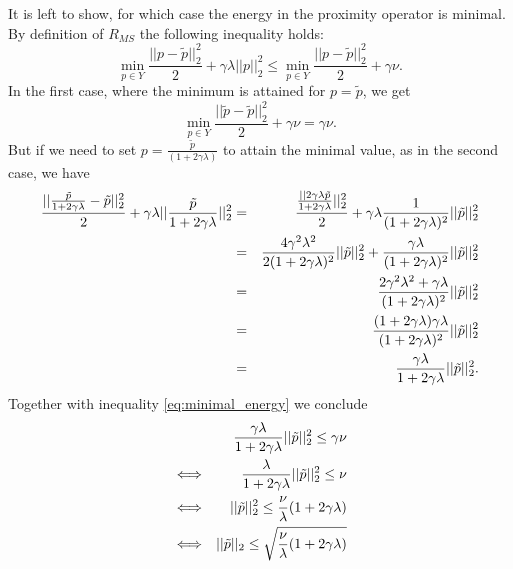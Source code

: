        It is left to show, for which case the energy in the proximity operator is minimal. By definition of  $R_{MS}$ the following inequality holds:
            \begin{equation}
                \min_{p \in Y} \frac{||p - \tilde{p}||_{2}^{2}}{2} + \gamma \lambda ||p||_{2}^{2} \le \min_{p \in Y} \frac{||p - \tilde{p}||_{2}^{2}}{2} + \gamma\nu.
                \label{eq:minimal_energy}
            \end{equation}
        In the first case, where the minimum is attained for $p = \tilde{p}$, we get
            $$
                \min_{p \in Y} \frac{||\tilde{p} - \tilde{p}||_{2}^{2}}{2} + \gamma\nu = \gamma \nu.
            $$
        But if we need to set $p = \frac{\tilde{p}}{(1 + 2\gamma \lambda)}$ to attain the minimal value, as in the second case, we have
            \begin{eqnarray}
                \frac{||\frac{\tilde{p}}{1 + 2\gamma\lambda} - \tilde{p}||_{2}^{2}}{2} + \gamma \lambda ||\frac{\tilde{p}}{1 + 2\gamma\lambda}||_{2}^{2} &=& \frac{\frac{||2\gamma\lambda \tilde{p}}{1 + 2\gamma\lambda}||_{2}^{2}}{2} + \gamma\lambda \frac{1}{(1 + 2\gamma\lambda)^{2}}||\tilde{p}||_{2}^{2} \notag \\
                &=& \frac{4\gamma^{2}\lambda^{2}}{2(1 + 2\gamma\lambda)^{2}} ||\tilde{p}||_{2}^{2} + \frac{\gamma\lambda}{(1 + 2\gamma\lambda)^{2}} ||\tilde{p}||_{2}^{2} \notag \\
                &=& \frac{2\gamma^{2}\lambda^{2} + \gamma\lambda}{(1 + 2\gamma\lambda)^{2}} ||\tilde{p}||_{2}^{2} \notag \\
                &=& \frac{(1 + 2\gamma\lambda)\gamma\lambda}{(1 + 2\gamma\lambda)^{2}} ||\tilde{p}||_{2}^{2} \notag \\
                &=& \frac{\gamma\lambda}{1 + 2\gamma\lambda} ||\tilde{p}||_{2}^{2}. \label{eq:bound_on_p}
            \end{eqnarray}
        Together with inequality \ref{eq:minimal_energy} we conclude
            \begin{eqnarray}
                && \frac{\gamma\lambda}{1 + 2\gamma\lambda} ||\tilde{p}||_{2}^{2} \le \gamma\nu \notag \\
                &\Longleftrightarrow& \frac{\lambda}{1 + 2\gamma\lambda} ||\tilde{p}||_{2}^{2} \le \nu \notag \\
                &\Longleftrightarrow& ||\tilde{p}||_{2}^{2} \le \frac{\nu}{\lambda}(1 + 2\gamma\lambda) \notag \\
                &\Longleftrightarrow& ||\tilde{p}||_{2} \le \sqrt{\frac{\nu}{\lambda}(1 + 2\gamma\lambda)} \label{eq:constraint_R}
            \end{eqnarray}
